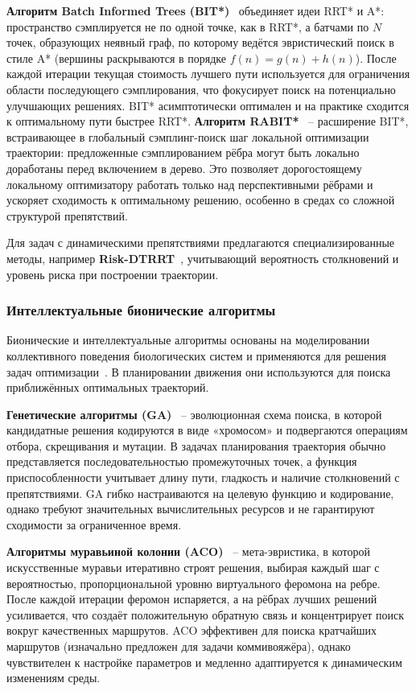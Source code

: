\documentclass[a4paper,12pt]{extarticle}
\begin{document}
    \textbf{Алгоритм Batch Informed Trees (BIT*)}~\cite{bit} объединяет идеи RRT* и A*: пространство сэмплируется не по одной точке, как в RRT*, а батчами по $N$ точек, образующих неявный граф, по которому ведётся эвристический поиск в стиле A* (вершины раскрываются в порядке $f(n) = g(n) + h(n)$).
    После каждой итерации текущая стоимость лучшего пути используется для ограничения области последующего сэмплирования, что фокусирует поиск на потенциально улучшающих решениях.
    BIT* асимптотически оптимален и на практике сходится к оптимальному пути быстрее RRT*.
    \textbf{Алгоритм RABIT*}~\cite{rabit} -- расширение BIT*, встраивающее в глобальный сэмплинг-поиск шаг локальной оптимизации траектории: предложенные сэмплированием рёбра могут быть локально доработаны перед включением в дерево.
    Это позволяет дорогостоящему локальному оптимизатору работать только над перспективными рёбрами и ускоряет сходимость к оптимальному решению, особенно в средах со сложной структурой препятствий.

    Для задач с динамическими препятствиями предлагаются специализированные методы, например \textbf{Risk-DTRRT}~\cite{drrt},
    учитывающий вероятность столкновений и уровень риска при построении траектории.

    \subsubsection{Интеллектуальные бионические алгоритмы}
    Бионические и интеллектуальные алгоритмы основаны на моделировании коллективного поведения биологических систем и
    применяются для решения задач оптимизации~\cite{bio_review}.
    В планировании движения они используются для поиска приближённых оптимальных траекторий.

    \textbf{Генетические алгоритмы (GA)}~\cite{ga} -- эволюционная схема поиска, в которой кандидатные решения кодируются в виде «хромосом» и подвергаются операциям отбора, скрещивания и мутации.
    В задачах планирования траектория обычно представляется последовательностью промежуточных точек, а функция приспособленности учитывает длину пути, гладкость и наличие столкновений с препятствиями.
    GA гибко настраиваются на целевую функцию и кодирование, однако требуют значительных вычислительных ресурсов и не гарантируют сходимости за ограниченное время.

    \textbf{Алгоритмы муравьиной колонии (ACO)}~\cite{aca} -- мета-эвристика, в которой искусственные муравьи итеративно строят решения, выбирая каждый шаг с вероятностью, пропорциональной уровню виртуального феромона на ребре.
    После каждой итерации феромон испаряется, а на рёбрах лучших решений усиливается, что создаёт положительную обратную связь и концентрирует поиск вокруг качественных маршрутов.
    ACO эффективен для поиска кратчайших маршрутов (изначально предложен для задачи коммивояжёра), однако чувствителен к настройке параметров и медленно адаптируется к динамическим изменениям среды.
\end{document}
